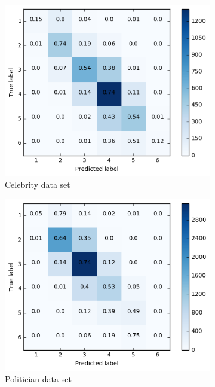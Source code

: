 \begin{figure}[h]
\begin{subfigure}{.5\textwidth}
  \includegraphics[width=.95\linewidth]{img/celeb_d2_cm_retweets}
  \caption{Celebrity data set}
  \label{fig:retw_distr_sub1}
\end{subfigure}%
\begin{subfigure}{.5\textwidth}
  \includegraphics[width=.95\linewidth]{img/polit_d2_cm_retweets}
  \caption{Politician data set}
  \label{fig:retw_distr_sub2}
\end{subfigure}
\begin{subfigure}{.5\textwidth}

\end{subfigure}
\end{figure}
